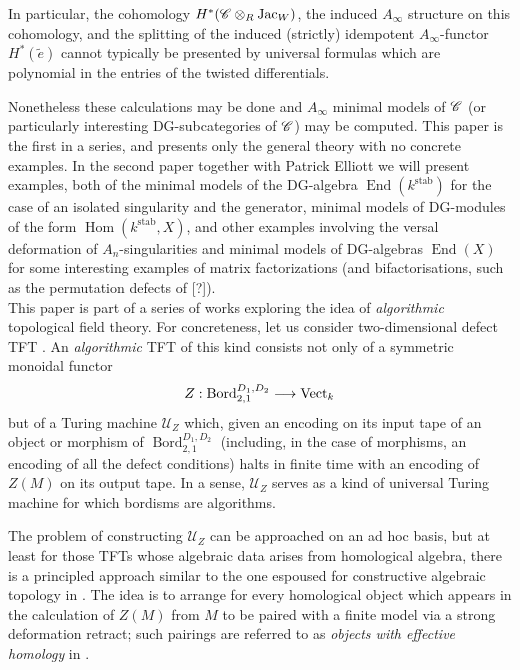 \documentclass[english,letter paper,12pt,leqno]{article}
\theoremstyle{example}
\numberwithin{equation}{section}
\def\stab{\operatorname{stab}}
\def\Hom{\operatorname{Hom}}
\def\jac{\operatorname{Jac}_W}
\DeclareMathOperator{\End}{End}
\begin{document}
In particular, the cohomology $H^*( \md{C} \otimes_R \jac )$, the induced $A_\infty$ structure on this cohomology, and the splitting of the induced (strictly) idempotent $A_\infty$-functor $H^*(\widetilde{e})$ cannot typically be presented by universal formulas which are polynomial in the entries of the twisted differentials. 

Nonetheless these calculations may be done and $A_\infty$ minimal models of $\mathscr{C}$ (or particularly interesting DG-subcategories of $\mathscr{C}$) may be computed. This paper is the first in a series, and presents only the general theory with no concrete examples. In the second paper together with Patrick Elliott we will present examples, both of the minimal models of the DG-algebra $\End(k^{\stab})$ for the case of an isolated singularity and the generator, minimal models of DG-modules of the form $\Hom(k^{\stab}, X)$, and other examples involving the versal deformation of $A_n$-singularities and minimal models of DG-algebras $\End(X)$ for some interesting examples of matrix factorizations (and bifactorisations, such as the permutation defects of [?]).
\\

This paper is part of a series of works \cite{??,??} exploring the idea of \emph{algorithmic} topological field theory. For concreteness, let us consider two-dimensional defect TFT \cite{??,??}. An \emph{algorithmic} TFT of this kind consists not only of a symmetric monoidal functor
\[
Z: \operatorname{Bord}_{2,1}^{D_1,D_2} \longrightarrow \operatorname{Vect}_k
\]
but of a Turing machine $\mathscr{U}_Z$ which, given an encoding on its input tape of an object or morphism of $\operatorname{Bord}_{2,1}^{D_1,D_2}$ (including, in the case of morphisms, an encoding of all the defect conditions) halts in finite time with an encoding of $Z(M)$ on its output tape. In a sense, $\mathscr{U}_Z$ serves as a kind of universal Turing machine for which bordisms are algorithms.

The problem of constructing $\mathscr{U}_Z$ can be approached on an ad hoc basis, but at least for those TFTs whose algebraic data arises from homological algebra, there is a principled approach similar to the one espoused for constructive algebraic topology in \cite{constructat}. The idea is to arrange for every homological object which appears in the calculation of $Z(M)$ from $M$ to be paired with a finite model via a strong deformation retract; such pairings are referred to as \emph{objects with effective homology} in \cite{constructat, constructat2}. %
\end{document}
